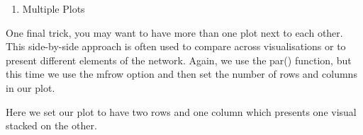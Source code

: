 \documentclass[
  letterpaper,
  DIV=11,
  numbers=noendperiod]{scrreprt}
\newenvironment{Shaded}{\begin{snugshade}}{\end{snugshade}}
\newcommand{\AttributeTok}[1]{\textcolor[rgb]{0.40,0.45,0.13}{#1}}
\newcommand{\ConstantTok}[1]{\textcolor[rgb]{0.56,0.35,0.01}{#1}}
\newcommand{\DecValTok}[1]{\textcolor[rgb]{0.68,0.00,0.00}{#1}}
\newcommand{\FloatTok}[1]{\textcolor[rgb]{0.68,0.00,0.00}{#1}}
\newcommand{\FunctionTok}[1]{\textcolor[rgb]{0.28,0.35,0.67}{#1}}
\newcommand{\NormalTok}[1]{\textcolor[rgb]{0.00,0.23,0.31}{#1}}
\newcommand{\SpecialCharTok}[1]{\textcolor[rgb]{0.37,0.37,0.37}{#1}}
\newcommand{\StringTok}[1]{\textcolor[rgb]{0.13,0.47,0.30}{#1}}
\providecommand{\tightlist}{%
  \setlength{\itemsep}{0pt}\setlength{\parskip}{0pt}}\usepackage{longtable,booktabs,array}
\begin{document}
\begin{enumerate}
\def\labelenumi{\arabic{enumi}.}
\setcounter{enumi}{2}
\tightlist
\item
  Multiple Plots
\end{enumerate}

One final trick, you may want to have more than one plot next to each
other. This side-by-side approach is often used to compare across
visualisations or to present different elements of the network. Again,
we use the par() function, but this time we use the mfrow option and
then set the number of rows and columns in our plot.

Here we set our plot to have two rows and one column which presents one
visual stacked on the other.

\begin{Shaded}
\end{Shaded}
\end{document}
